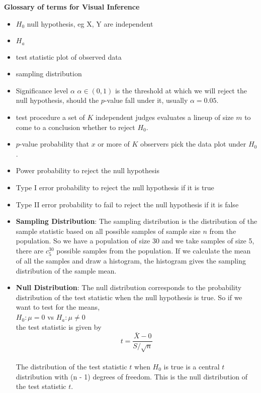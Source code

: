 \documentclass[12]{report}
\begin{document}
\centerline{\bf\large Glossary of terms for Visual Inference}

\begin{itemize}
\item $H_0$ null hypothesis, eg X, Y are independent \\
\item $H_a$  \\
\item test statistic  plot of observed data  \\
\item sampling distribution  \\
\item Significance level $\alpha$  $\alpha \in (0,1)$ is the threshold at which we will reject the null hypothesis, should the $p$-value fall under it, usually $\alpha=0.05$.\\
\item test procedure  a set of $K$ independent judges evaluates a lineup of size $m$ to come to a conclusion whether to reject $H_0$.\\
\item $p$-value  probability that $x$ or more of $K$ observers pick the data plot  under $H_0$. \\
\item Power  probability to reject the null hypothesis\\
\item Type I error  probability to reject the null hypothesis if it is true\\
\item Type II error  probability to fail to reject the null hypothesis if it is false\\

\item \textbf{Sampling Distribution}: The sampling distribution is the distribution of the sample statistic based on all possible samples of sample size $n$ from the population. So we have a population of size 30 and we take samples of size 5, there are $c^{30}_5$ possible samples from the population. If we calculate the mean of all the samples and draw a histogram, the histogram gives the sampling distribution of the sample mean.
\item \textbf{Null Distribution}: The null distribution corresponds to the probability distribution of the test statistic when the null hypothesis is true. So if we want to test for the means, \\

$H_0: \mu = 0$ vs $H_a: \mu \ne 0$\\

the test statistic is given by \\

$$t=\frac{\bar{X} - 0}{S/\sqrt{n}}$$\\

The distribution of the test statistic $t$ when $H_0$ is true is a central $t$ distribution with (n - 1) degrees of freedom. This is the null distribution of the test statistic $t$.
\end{itemize}
\end{document}
